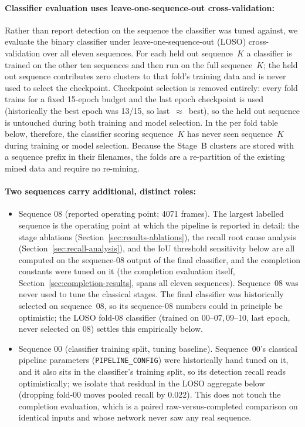 \documentclass[a4paper,12pt]{report}
\begin{document}
\paragraph{Classifier evaluation uses leave-one-sequence-out cross-validation:}
Rather than report detection on the sequence the classifier was tuned against, we
evaluate the binary classifier under leave-one-sequence-out (LOSO)
cross-validation over all eleven sequences. For each held out sequence~$K$ a
classifier is trained on the other ten sequences and then run on the full
sequence~$K$; the held out sequence contributes zero clusters to that
fold's training data and is never used to select the checkpoint. Checkpoint
selection is removed entirely: every fold trains for a fixed \num{15}-epoch
budget and the last epoch checkpoint is used (historically the best epoch was
\num{13}/\num{15}, so last~$\approx$~best), so the held out sequence is untouched
during both training and model selection. In the per fold table below,
therefore, the classifier scoring sequence~$K$ has never seen
sequence~$K$ during training or model selection. Because the
Stage~B clusters are stored with a sequence prefix in their filenames, the folds
are a re-partition of the existing mined data and require no re-mining.

\paragraph{Two sequences carry additional, distinct roles:}
\begin{itemize}
  \item Sequence 08 (reported operating point; \num{4071} frames). The
    largest labelled sequence is the operating point at which the pipeline is
    reported in detail: the stage ablations (Section~\ref{sec:results-ablations}),
    the recall root cause analysis (Section~\ref{sec:recall-analysis}), and the
    IoU threshold sensitivity below are all computed on the sequence-08 output of the
    final classifier, and the completion constants were tuned on it (the completion
    evaluation itself, Section~\ref{sec:completion-results}, spans all eleven
    sequences). Sequence~08 was never used to tune the classical stages. The final
    classifier was historically selected on sequence~08, so its sequence-08 numbers
    could in principle be optimistic; the LOSO fold-08 classifier (trained on
    \numrange{00}{07},\,\numrange{09}{10}, last epoch, never selected on 08) settles
    this empirically below.
  \item Sequence 00 (classifier training split, tuning baseline).
    Sequence~00's classical pipeline parameters (\texttt{PIPELINE\_CONFIG}) were
    historically hand tuned on it, and it also sits in the classifier's training split,
    so its detection recall reads optimistically; we isolate that residual in the
    LOSO aggregate below (dropping fold-00 moves pooled recall by \num{0.022}). This does
    not touch the completion evaluation, which is a paired raw-versus-completed comparison
    on identical inputs and whose network never saw any real sequence.
\end{itemize}
\end{document}
